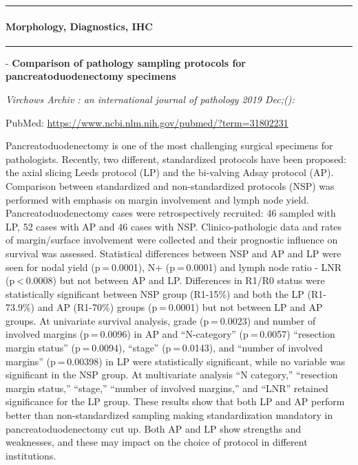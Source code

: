 \documentclass[
]{article}
\renewcommand{\linethickness}{0.05em}
\begin{document}
\begin{center}\rule{0.5\linewidth}{\linethickness}\end{center}

\hypertarget{pancreas_morphology}{%
\paragraph{Morphology, Diagnostics, IHC}\label{pancreas_morphology}}

\begin{center}\rule{0.5\linewidth}{\linethickness}\end{center}

- \textbf{Comparison of pathology sampling protocols for
pancreatoduodenectomy specimens}

\emph{Virchows Archiv : an international journal of pathology 2019
Dec;():}

PubMed: \url{https://www.ncbi.nlm.nih.gov/pubmed/?term=31802231}

Pancreatoduodenectomy is one of the most challenging surgical specimens
for pathologists. Recently, two different, standardized protocols have
been proposed: the axial slicing Leeds protocol (LP) and the bi-valving
Adsay protocol (AP). Comparison between standardized and
non-standardized protocols (NSP) was performed with emphasis on margin
involvement and lymph node yield. Pancreatoduodenectomy cases were
retrospectively recruited: 46 sampled with LP, 52 cases with AP and 46
cases with NSP. Clinico-pathologic data and rates of margin/surface
involvement were collected and their prognostic influence on survival
was assessed. Statistical differences between NSP and AP and LP were
seen for nodal yield (p = 0.0001), N+ (p = 0.0001) and lymph node ratio
- LNR (p \textless{} 0.0008) but not between AP and LP. Differences in
R1/R0 status were statistically significant between NSP group (R1-15\%)
and both the LP (R1-73.9\%) and AP (R1-70\%) groups (p = 0.0001) but not
between LP and AP groups. At univariate survival analysis, grade
(p = 0.0023) and number of involved margins (p = 0.0096) in AP and
``N-category'' (p = 0.0057) ``resection margin status'' (p = 0.0094),
``stage'' (p = 0.0143), and ``number of involved margins'' (p = 0.00398)
in LP were statistically significant, while no variable was significant
in the NSP group. At multivariate analysis ``N category,'' ``resection
margin status,'' ``stage,'' ``number of involved margins,'' and ``LNR''
retained significance for the LP group. These results show that both LP
and AP perform better than non-standardized sampling making
standardization mandatory in pancreatoduodenectomy cut up. Both AP and
LP show strengths and weaknesses, and these may impact on the choice of
protocol in different institutions.
\end{document}
